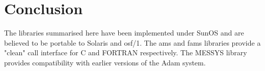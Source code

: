 \section {Conclusion}

The libraries summarised here have been implemented under SunOS and are
believed to be portable to Solaris and osf/1. The ams and fams libraries
provide a "clean" call interface for C and FORTRAN respectively. The
MESSYS library provides compatibility with earlier versions of the Adam
system.


